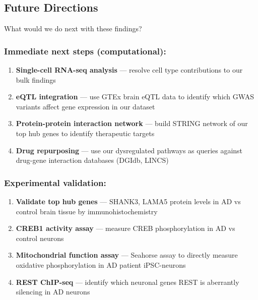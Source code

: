 \documentclass[
]{article}
\providecommand{\tightlist}{%
  \setlength{\itemsep}{0pt}\setlength{\parskip}{0pt}}
\begin{document}
\subsection{Future Directions}\label{future-directions}

What would we do next with these findings?

\subsubsection{Immediate next steps
(computational):}\label{immediate-next-steps-computational}

\begin{enumerate}
\def\labelenumi{\arabic{enumi}.}
\tightlist
\item
  \textbf{Single-cell RNA-seq analysis} --- resolve cell type
  contributions to our bulk findings
\item
  \textbf{eQTL integration} --- use GTEx brain eQTL data to identify
  which GWAS variants affect gene expression in our dataset
\item
  \textbf{Protein-protein interaction network} --- build STRING network
  of our top hub genes to identify therapeutic targets
\item
  \textbf{Drug repurposing} --- use our dysregulated pathways as queries
  against drug-gene interaction databases (DGIdb, LINCS)
\end{enumerate}

\subsubsection{Experimental validation:}\label{experimental-validation}

\begin{enumerate}
\def\labelenumi{\arabic{enumi}.}
\tightlist
\item
  \textbf{Validate top hub genes} --- SHANK3, LAMA5 protein levels in AD
  vs control brain tissue by immunohistochemistry
\item
  \textbf{CREB1 activity assay} --- measure CREB phosphorylation in AD
  vs control neurons
\item
  \textbf{Mitochondrial function assay} --- Seahorse assay to directly
  measure oxidative phosphorylation in AD patient iPSC-neurons
\item
  \textbf{REST ChIP-seq} --- identify which neuronal genes REST is
  aberrantly silencing in AD neurons
\end{enumerate}
\end{document}
